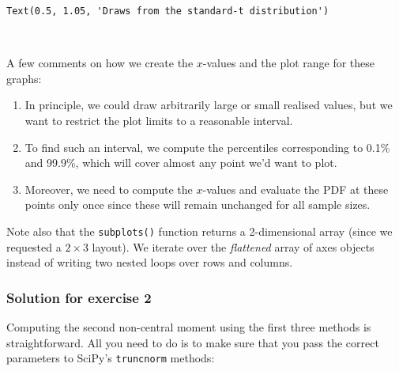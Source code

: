 \documentclass{scrartcl}
\makeatletter
\providecommand{\tightlist}{%
      \setlength{\itemsep}{0pt}\setlength{\parskip}{0pt}}
\newcommand{\boxspacing}{\kern\kvtcb@left@rule\kern\kvtcb@boxsep}
\newcommand{\prompt}[4]{
        {\ttfamily\llap{{\color{#2}[#3]:\hspace{3pt}#4}}\vspace{-\baselineskip}}
    }
\makeatother
\begin{document}
            \begin{tcolorbox}[breakable, size=fbox, boxrule=.5pt, pad at break*=1mm, opacityfill=0]
\prompt{Out}{outcolor}{21}{\boxspacing}
\begin{Verbatim}[commandchars=\\\{\}]
Text(0.5, 1.05, 'Draws from the standard-t distribution')
\end{Verbatim}
\end{tcolorbox}
        
    \begin{center}
    \end{center}
    { \hspace*{\fill} \\}
    
    A few comments on how we create the \(x\)-values and the plot range for
these graphs:

\begin{enumerate}
\def\labelenumi{\arabic{enumi}.}
\tightlist
\item
  In principle, we could draw arbitrarily large or small realised
  values, but we want to restrict the plot limits to a reasonable
  interval.
\item
  To find such an interval, we compute the percentiles corresponding to
  0.1\% and 99.9\%, which will cover almost any point we'd want to plot.
\item
  Moreover, we need to compute the \(x\)-values and evaluate the PDF at
  these points only once since these will remain unchanged for all
  sample sizes.
\end{enumerate}

Note also that the \texttt{subplots()} function returns a 2-dimensional
array (since we requested a \(2 \times 3\) layout). We iterate over the
\emph{flattened} array of axes objects instead of writing two nested
loops over rows and columns.

    \hypertarget{solution-for-exercise-2}{%
\subsubsection{Solution for exercise 2}\label{solution-for-exercise-2}}

Computing the second non-central moment using the first three methods is
straightforward. All you need to do is to make sure that you pass the
correct parameters to SciPy's \texttt{truncnorm} methods:
\end{document}
